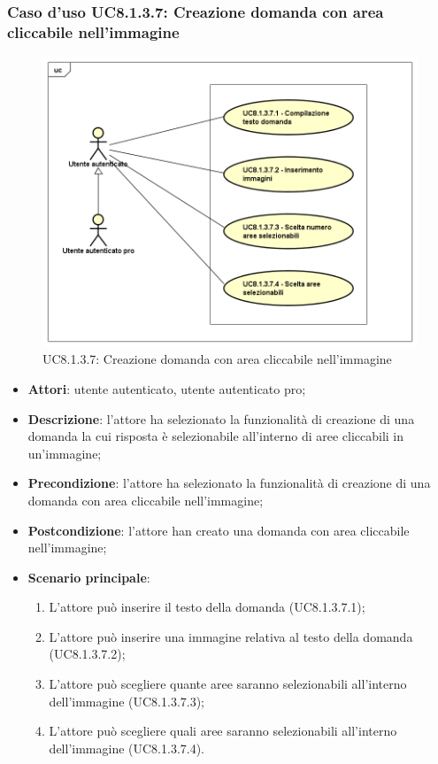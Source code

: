 \subsubsection{Caso d'uso UC8.1.3.7: Creazione domanda con area cliccabile nell'immagine}
\label{UC8.1.3.7}
\begin{figure}[h]
	\centering
	\includegraphics[scale=0.5,keepaspectratio]{UML/UC8_1_3_7.png}
	\caption{UC8.1.3.7: Creazione domanda con area cliccabile nell'immagine}
\end{figure}
\FloatBarrier
\begin{itemize}
	\item \textbf{Attori}: utente autenticato, utente autenticato pro;
	\item \textbf{Descrizione}: l'attore ha selezionato la funzionalità di creazione di una domanda la cui risposta è selezionabile all'interno di aree cliccabili in un'immagine;
	\item \textbf{Precondizione}: l'attore ha selezionato la funzionalità di creazione di una domanda con area cliccabile nell'immagine; 
	\item \textbf{Postcondizione}: l'attore han creato una domanda con area cliccabile nell'immagine;
	\item \textbf{Scenario principale}:
		\begin{enumerate}
	       	\item L'attore può inserire il testo della domanda (UC8.1.3.7.1);
	        \item L'attore può inserire una immagine relativa al testo della domanda (UC8.1.3.7.2);
		\item L'attore può scegliere quante aree saranno selezionabili all'interno dell'immagine (UC8.1.3.7.3);
		\item L'attore può scegliere quali aree saranno selezionabili all'interno dell'immagine (UC8.1.3.7.4).
	 	\end{enumerate}
\end{itemize}

